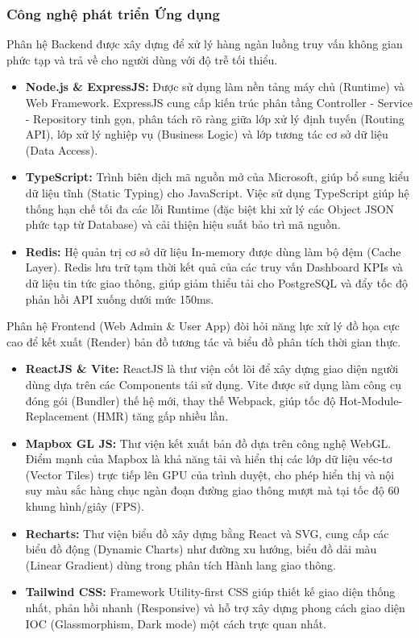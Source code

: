 \subsubsection{Công nghệ phát triển Ứng dụng}


Phân hệ Backend được xây dựng để xử lý hàng ngàn luồng truy vấn không gian phức tạp và trả về cho người dùng với độ trễ tối thiểu.
\begin{itemize}
    \item \textbf{Node.js \& ExpressJS:} Được sử dụng làm nền tảng máy chủ (Runtime) và Web Framework. ExpressJS cung cấp kiến trúc phân tầng Controller - Service - Repository tinh gọn, phân tách rõ ràng giữa lớp xử lý định tuyến (Routing API), lớp xử lý nghiệp vụ (Business Logic) và lớp tương tác cơ sở dữ liệu (Data Access).
    \item \textbf{TypeScript:} Trình biên dịch mã nguồn mở của Microsoft, giúp bổ sung kiểu dữ liệu tĩnh (Static Typing) cho JavaScript. Việc sử dụng TypeScript giúp hệ thống hạn chế tối đa các lỗi Runtime (đặc biệt khi xử lý các Object JSON phức tạp từ Database) và cải thiện hiệu suất bảo trì mã nguồn.
    \item \textbf{Redis:} Hệ quản trị cơ sở dữ liệu In-memory được dùng làm bộ đệm (Cache Layer). Redis lưu trữ tạm thời kết quả của các truy vấn Dashboard KPIs và dữ liệu tin tức giao thông, giúp giảm thiểu tải cho PostgreSQL và đẩy tốc độ phản hồi API xuống dưới mức 150ms.
\end{itemize}


Phân hệ Frontend (Web Admin \& User App) đòi hỏi năng lực xử lý đồ họa cực cao để kết xuất (Render) bản đồ tương tác và biểu đồ phân tích thời gian thực.
\begin{itemize}
    \item \textbf{ReactJS \& Vite:} ReactJS là thư viện cốt lõi để xây dựng giao diện người dùng dựa trên các Components tái sử dụng. Vite được sử dụng làm công cụ đóng gói (Bundler) thế hệ mới, thay thế Webpack, giúp tốc độ Hot-Module-Replacement (HMR) tăng gấp nhiều lần.
    \item \textbf{Mapbox GL JS:} Thư viện kết xuất bản đồ dựa trên công nghệ WebGL. Điểm mạnh của Mapbox là khả năng tải và hiển thị các lớp dữ liệu véc-tơ (Vector Tiles) trực tiếp lên GPU của trình duyệt, cho phép hiển thị và nội suy màu sắc hàng chục ngàn đoạn đường giao thông mượt mà tại tốc độ 60 khung hình/giây (FPS).
    \item \textbf{Recharts:} Thư viện biểu đồ xây dựng bằng React và SVG, cung cấp các biểu đồ động (Dynamic Charts) như đường xu hướng, biểu đồ dải màu (Linear Gradient) dùng trong phân tích Hành lang giao thông.
    \item \textbf{Tailwind CSS:} Framework Utility-first CSS giúp thiết kế giao diện thống nhất, phản hồi nhanh (Responsive) và hỗ trợ xây dựng phong cách giao diện IOC (Glassmorphism, Dark mode) một cách trực quan nhất.
\end{itemize}

